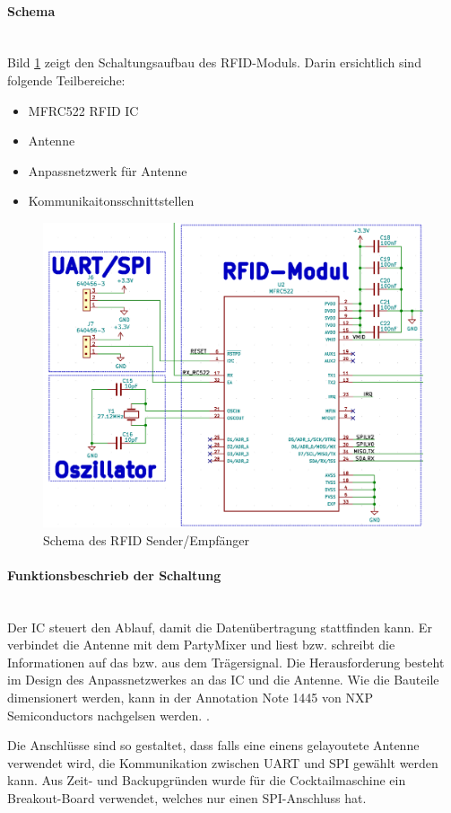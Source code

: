 \paragraph{Schema}\mbox{}\\

Bild \ref{fig:Schema_RFID} zeigt den Schaltungsaufbau des RFID-Moduls. Darin ersichtlich sind folgende Teilbereiche:

\begin{itemize}
\item MFRC522 RFID IC
\item Antenne
\item Anpassnetzwerk für Antenne
\item Kommunikaitonsschnittstellen
\end{itemize}

\begin{figure}[!h]
\center
\includegraphics[width = 0.6 \textwidth]{graphics/Schema_RFID}
\caption{Schema des RFID Sender/Empfänger}
\label{fig:Schema_RFID}
\end{figure}


\paragraph{Funktionsbeschrieb der Schaltung}\mbox{}\\

Der IC steuert den Ablauf, damit die Datenübertragung stattfinden kann. Er verbindet die Antenne mit dem PartyMixer und liest bzw. schreibt die Informationen auf das bzw. aus dem Trägersignal. Die Herausforderung besteht im Design des Anpassnetzwerkes an das IC und die Antenne. Wie die Bauteile dimensionert werden, kann in der Annotation Note 1445 von NXP Semiconductors nachgelsen werden. \cite{nxp_bv_2010_antenna_2010}.

Die Anschlüsse sind so gestaltet, dass falls eine einens gelayoutete Antenne verwendet wird, die Kommunikation zwischen UART und SPI gewählt werden kann. Aus Zeit- und Backupgründen wurde für die Cocktailmaschine ein Breakout-Board verwendet, welches nur einen SPI-Anschluss hat.

